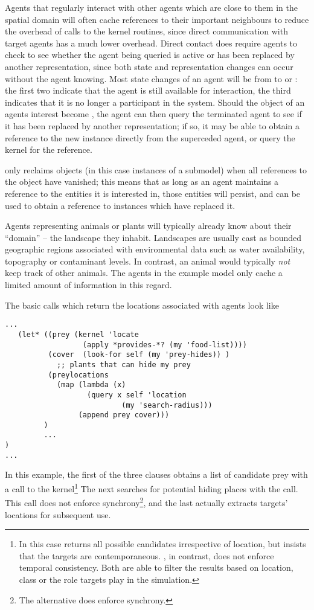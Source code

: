 Agents that regularly interact with other agents which are close to
them in the spatial domain will often cache references to their
important neighbours to reduce the overhead of calls to the kernel
routines, since direct communication with target agents has a much
lower overhead. Direct contact does require agents to check to see
whether the agent being queried is active or has been replaced by
another representation, since both state and representation changes
can occur without the agent knowing. Most state changes of an agent
will be from  to  or : the first two
indicate that the agent is still available for interaction, the third
indicates that it is no longer a participant in the system. Should the
object of an agents interest become , the agent can
then query the terminated agent to see if it has been replaced by
another representation; if so, it may be able to obtain a reference to
the new instance directly from the superceded agent, or query the
kernel for the reference.

\Scheme only reclaims objects (in this case instances of a submodel)
when all references to the object have vanished; this means that as
long as an agent maintains a reference to the entities it is
interested in, those entities will persist, and can be used to obtain
a reference to instances which have replaced it.

Agents representing animals or plants will typically already know
about their ``domain'' -- the landscape they inhabit.  Landscapes are
usually cast as bounded geographic regions associated with
environmental data such as water availability, topography or
contaminant levels. In contrast, an animal would typically \emph{not}
keep track of other animals.  The agents in the example model only
cache a limited amount of information in this regard.

The basic calls which return the locations associated with agents look
like
\begin{verbatim}
...
   (let* ((prey (kernel 'locate 
                  (apply *provides-*? (my 'food-list))))
          (cover  (look-for self (my 'prey-hides)) )
            ;; plants that can hide my prey
          (preylocations 
            (map (lambda (x) 
                   (query x self 'location 
                           (my 'search-radius))) 
                 (append prey cover)))
         )
         ...
)
...
\end{verbatim}
In this example, the first of the three clauses obtains a list of
candidate prey with a call to the kernel\footnote{In this case
   returns all possible candidates irrespective of
  location, but insists that the targets are
  contemporaneous. , in contrast, does not enforce
  temporal consistency. Both are able to filter the results based on
  location, class or the role targets play in the simulation.}  The
next searches for potential hiding places with the 
call. This call does not enforce synchrony\footnote{The alternative
   does enforce synchrony.}, and the last actually
extracts targets' locations for subsequent use.

